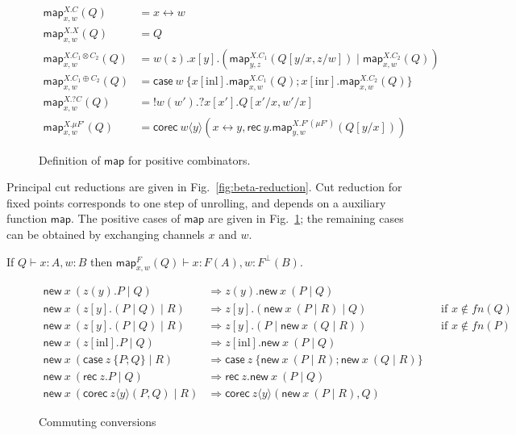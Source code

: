\documentclass[orivec,envcountsame]{llncs}
\newcommand{\cpdual}[1]{#1^\perp}
\newcommand{\cpquery}[1]{{? #1}}
\newcommand{\cptyp}[2]{#1 \vdash #2}
\newcommand{\mapname}{\mathsf{map}}
\newcommand{\map}[3]{\mapname^{#1}_{#2}(#3)}
\newcommand{\mkwd}[1]{\mathsf{#1}}
\newcommand{\link}[2]{#1 \leftrightarrow #2}
\newcommand{\cut}[4]{\mkwd{new}\:#1 \: (#3 \mid #4)}
\newcommand{\replicate}[2]{{!#1(#2)}}
\newcommand{\derelict}[2]{{?#1[#2]}}
\newcommand{\rec}[1]{\mkwd{rec}\:#1}
\newcommand{\corec}[5]{\mkwd{corec}\:#1 \langle #2 \rangle (#4,#5)}
\newcommand{\clabel}[1]{\mathrm{#1}}
\renewcommand{\case}[2]{\mkwd{case}\:#1\:\{#2\}}
\newcommand{\sel}[2]{#1[\clabel{#2}]}
\begin{document}
\begin{figure}\small
\begin{align*}
  \map{X.C}{x,w}{Q} &= \link{x}{w} \\
  \map{X.X}{x,w}{Q} &= Q \\
  \map{X.C_1 \otimes C_2}{x,w}{Q} &= w(z).x[y].(\map{X.C_1}{y,z}{Q[y/x,z/w]} \mid \map{X.C_2}{x,w}{Q}) \\
  \map{X.C_1 \oplus C_2}{x,w}{Q} &= \case{w}{\sel{x}{inl}.\map{X.C_1}{x,w}{Q}; \sel{x}{inr}.\map{X.C_2}{x,w}{Q}} \\
  \map{X.\cpquery{C}}{x,w}{Q} &= \replicate{w}{w'}.\derelict{x}{x'}.Q[x'/x,w'/x] \\
  \map{X.\mu F'}{x,w}{Q} &= \corec{w}{y}{\nu(\cpdual{C}(A))}{\link{x}{y}}{\rec{y}.\map{X.F' (\mu F')}{y,w}{Q[y/x]}}
\end{align*}
\caption{Definition of $\mapname$ for positive combinators.}\label{fig:map}
\end{figure}

Principal cut reductions are given in Fig.~\ref{fig:beta-reduction}. Cut reduction for fixed points
corresponds to one step of unrolling, and depends on a auxiliary function $\mapname$. The positive
cases of $\mapname$ are given in Fig.~\ref{fig:map}; the remaining cases can be obtained by
exchanging channels $x$ and $w$.

\begin{lemma}
  If $\cptyp{Q}{x:A,w:B}$ then \(\cptyp{\map{F}{x,w}{Q}}{x:F(A), w:\cpdual{F}(B)}.\)
\end{lemma}

\begin{figure}\small
\begin{align*}
  \cut{x}{A}{z(y).P}{Q} &\Longrightarrow z(y).\cut{x}{A}{P}{Q} \\
  \cut{x}{A}{z[y].(P \mid Q)}{R} &\Longrightarrow z[y].(\cut{x}{A}{P}{R} \mid Q) &&\text{if $x \not\in fn(Q)$} \\
  \cut{x}{A}{z[y].(P \mid Q)}{R} &\Longrightarrow z[y].(P \mid \cut{x}{A}{Q}{R}) &&\text{if $x \not\in fn(P)$} \\
  \cut{x}{A}{\sel{z}{inl}.P}{Q} &\Longrightarrow \sel{z}{inl}.\cut{x}{A}{P}{Q} \\
  \cut{x}{A}{\case{z}{P;Q}}{R} &\Longrightarrow \case{z}{\cut{x}{A}{P}{R}; \cut{x}{A}{Q}{R}} \\
  \cut{x}{A}{\rec{z}.P}{Q} &\Longrightarrow \rec{z}.\cut{x}{A}{P}{Q} \\
  \cut{x}{A}{\corec{z}{y}{B}{P}{Q}}{R} &\Longrightarrow \corec{z}{y}{B}{\cut{x}{A}{P}{R}}{Q}
\end{align*}
\caption{Commuting conversions}\label{fig:commuting}
\end{figure}
\end{document}

